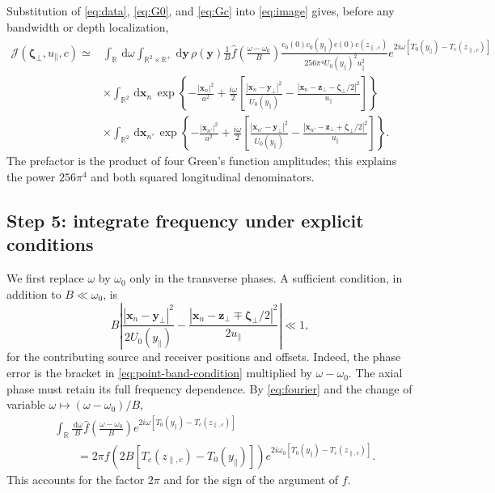 \documentclass[11pt]{article}
\newcommand{\R}{\mathbb{R}}
\newcommand{\bx}{\bm{x}}
\newcommand{\by}{\bm{y}}
\newcommand{\bz}{\bm{z}}
\newcommand{\bzeta}{\boldsymbol{\zeta}}
\newcommand{\dd}{\,\mathrm{d}}
\begin{document}
Substitution of \eqref{eq:data}, \eqref{eq:G0}, and \eqref{eq:Gc} into
\eqref{eq:image} gives, before any bandwidth or depth localization,
\begin{align}
\mathcal J(\bzeta_\perp,u_\parallel,c)
\simeq{}&\int_\R\dd\omega\int_{\R^2\times\R^+}\dd\by\,
\rho(\by)\frac{1}{B}\widehat f\!\left(\frac{\omega-\omega_0}{B}\right)
\frac{c_0(0)c_0(y_\parallel)c(0)c(z_{\parallel,c})}
{256\pi^4U_0(y_\parallel)^2u_\parallel^2}
e^{2i\omega[T_0(y_\parallel)-T_c(z_{\parallel,c})]}
\nonumber\\
&\times\int_{\R^2}\dd\bx_n\,
\exp\!\left\{-\frac{|\bx_n|^2}{a^2}
+\frac{i\omega}{2}\left[
\frac{|\bx_n-\by_\perp|^2}{U_0(y_\parallel)}
-\frac{|\bx_n-\bz_\perp-\bzeta_\perp/2|^2}{u_\parallel}
\right]\right\}
\nonumber\\
&\times\int_{\R^2}\dd\bx_{n'}\,
\exp\!\left\{-\frac{|\bx_{n'}|^2}{a^2}
+\frac{i\omega}{2}\left[
\frac{|\bx_{n'}-\by_\perp|^2}{U_0(y_\parallel)}
-\frac{|\bx_{n'}-\bz_\perp+\bzeta_\perp/2|^2}{u_\parallel}
\right]\right\}.
\label{eq:J-before-localization}
\end{align}
The prefactor is the product of four Green's function amplitudes;
this explains the power $256\pi^4$ and both squared longitudinal
denominators.

\subsection{Step 5: integrate frequency under explicit conditions}

We first replace $\omega$ by $\omega_0$ only in the transverse phases.
A sufficient condition, in addition to $B\ll\omega_0$, is
\begin{equation}
B\left|
\frac{|\bx_n-\by_\perp|^2}{2U_0(y_\parallel)}
-\frac{|\bx_n-\bz_\perp\mp\bzeta_\perp/2|^2}{2u_\parallel}
\right|\ll1,
\label{eq:point-band-condition}
\end{equation}
for the contributing source and receiver positions and offsets.
Indeed, the phase error is the bracket in
\eqref{eq:point-band-condition} multiplied by $\omega-\omega_0$.
The axial phase must retain its full frequency dependence. By
\eqref{eq:fourier} and the change of variable
$\omega\mapsto(\omega-\omega_0)/B$,
\begin{align}
&\int_\R\frac{\dd\omega}{B}
\widehat f\!\left(\frac{\omega-\omega_0}{B}\right)
e^{2i\omega[T_0(y_\parallel)-T_c(z_{\parallel,c})]}
\nonumber\\
&\qquad=2\pi
f\!\left(2B[T_c(z_{\parallel,c})-T_0(y_\parallel)]\right)
e^{2i\omega_0[T_0(y_\parallel)-T_c(z_{\parallel,c})]}.
\label{eq:frequency-integral}
\end{align}
This accounts for the factor $2\pi$ and for the sign of the argument
of $f$.
\end{document}
